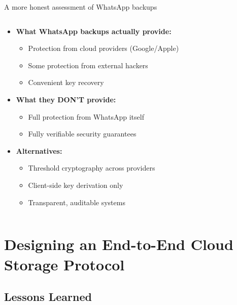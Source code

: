 \documentclass[aspectratio=169, lualatex, handout]{beamer}
\begin{document}
\begin{frame}{A more honest assessment of WhatsApp backups}
	\begin{columns}[c]
		\begin{column}{1\textwidth}
			\begin{itemize}
				\item \textbf{What WhatsApp backups actually provide:}
				      \begin{itemize}
					      \item Protection from cloud providers (Google/Apple)
					      \item Some protection from external hackers
					      \item Convenient key recovery
				      \end{itemize}
				\item \textbf{What they DON'T provide:}
				      \begin{itemize}
					      \item Full protection from WhatsApp itself
					      \item Fully verifiable security guarantees
				      \end{itemize}
				\item \textbf{Alternatives:}
				      \begin{itemize}
					      \item Threshold cryptography across providers
					      \item Client-side key derivation only
					      \item Transparent, auditable systems
				      \end{itemize}
			\end{itemize}
		\end{column}
	\end{columns}
\end{frame}

\section{Designing an End-to-End Cloud Storage Protocol}

\subsection{Lessons Learned}
\end{document}
